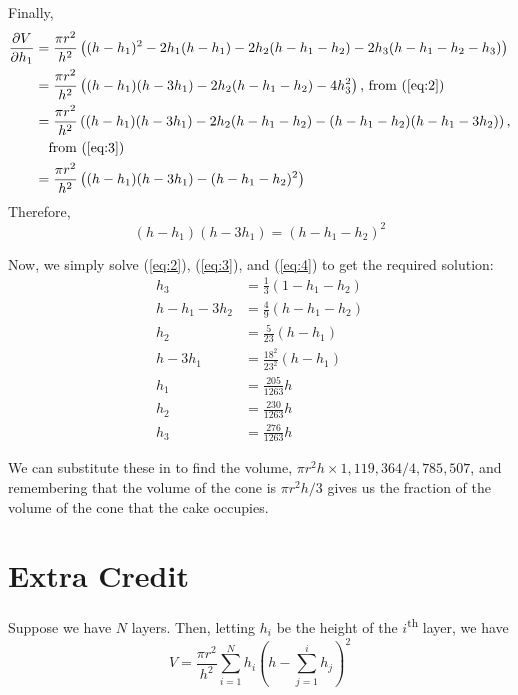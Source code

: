 \documentclass[12pt]{article}
\newcommand{\ts}[1]{\textsuperscript{#1}}
\begin{document}
Finally,
\begin{align*}
  \frac{\partial V}{\partial h_1} &= \frac{\pi r^2}{h^2}\left( (h - h_1)^2 - 2h_1(h-h_1) - 2h_2(h - h_1 - h_2) - 2h_3(h - h_1 - h_2 - h_3) \right)\\
                                  &= \frac{\pi r^2}{h^2} \left( (h-h_1)(h-3h_1) - 2h_2(h-h_1 - h_2) - 4h_3^2 \right)\text{, from (\ref{eq:2})} \\
                                  &= \frac{\pi r^2}{h^2} \left( (h-h_1)(h-3h_1) - 2h_2(h-h_1 - h_2) - (h-h_1-h_2)(h-h_1-3h_2) \right), \\
                                  &\quad \text{from (\ref{eq:3})}\\
  &= \frac{\pi r^2}{h^2}\left( (h-h_1)(h-3h_1) - (h-h_1 - h_2)^2 \right)
\end{align*}
Therefore,
\begin{equation}
  \label{eq:4}
  (h-h_1)(h-3h_1) = (h-h_1 - h_2)^2
\end{equation}

Now, we simply solve (\ref{eq:2}), (\ref{eq:3}), and (\ref{eq:4}) to get the required solution:
\begin{align*}
  h_3 &= \frac{1}{3}(1-h_1-h_2) \\
  h - h_1 - 3h_2 &= \frac{4}{9}(h-h_1-h_2) \\
  h_2 &= \frac{5}{23}(h-h_1)\\
  h - 3h_1 &= \frac{18^2}{23^2} (h-h_1) \\
  h_1 &= \frac{205}{1263}h \\
  h_2 &= \frac{230}{1263}h \\
  h_3 &= \frac{276}{1263}h
\end{align*}

We can substitute these in to find the volume, $\pi r^2 h \times 1,119,364/4,785,507$, and remembering that the volume of the cone is $\pi r^2 h / 3$ gives us the fraction of the volume of the cone that the cake occupies.

\section{Extra Credit}
\label{sec:extra-credit}

Suppose we have $N$ layers. Then, letting $h_i$ be the height of the $i$\ts{th} layer, we have
\begin{equation*}
  V = \frac{\pi r^2}{h^2} \sum_{i=1}^N h_i \left( h - \sum_{j=1}^i h_j \right)^2
\end{equation*}
\end{document}
